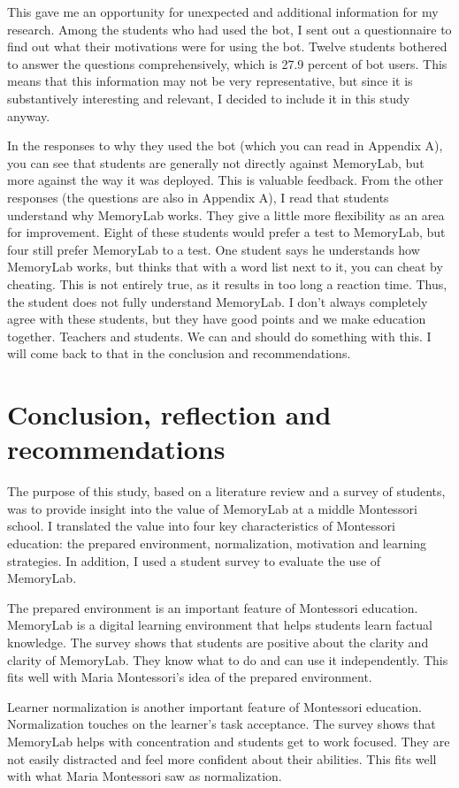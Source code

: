 \documentclass[12pt, a4paper]{article}
\begin{document}
{{This gave me an opportunity for unexpected and additional information for my research. Among the students who had used the bot, I sent out a questionnaire to find out what their motivations were for using the bot. Twelve students bothered to answer the questions comprehensively, which is 27.9 percent of bot users. This means that this information may not be very representative, but since it is substantively interesting and relevant, I decided to include it in this study anyway.

In the responses to why they used the bot (which you can read in Appendix A), you can see that students are generally not directly against MemoryLab, but more against the way it was deployed. This is valuable feedback. From the other responses (the questions are also in Appendix A), I read that students understand why MemoryLab works. They give a little more flexibility as an area for improvement. Eight of these students would prefer a test to MemoryLab, but four still prefer MemoryLab to a test. One student says he understands how MemoryLab works, but thinks that with a word list next to it, you can cheat by cheating. This is not entirely true, as it results in too long a reaction time. Thus, the student does not fully understand MemoryLab. I don't always completely agree with these students, but they have good points and we make education together. Teachers and students. We can and should do something with this. I will come back to that in the conclusion and recommendations.
\newpage
\section{Conclusion, reflection and recommendations}
The purpose of this study, based on a literature review and a survey of students, was to provide insight into the value of MemoryLab at a middle Montessori school. I translated the value into four key characteristics of Montessori education: the prepared environment, normalization, motivation and learning strategies. In addition, I used a student survey to evaluate the use of MemoryLab.

The prepared environment is an important feature of Montessori education. MemoryLab is a digital learning environment that helps students learn factual knowledge. The survey shows that students are positive about the clarity and clarity of MemoryLab. They know what to do and can use it independently. This fits well with Maria Montessori's idea of the prepared environment.

Learner normalization is another important feature of Montessori education. Normalization touches on the learner's task acceptance. The survey shows that MemoryLab helps with concentration and students get to work focused. They are not easily distracted and feel more confident about their abilities. This fits well with what Maria Montessori saw as normalization.

}}
\end{document}
